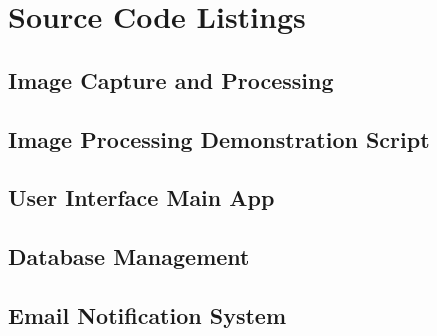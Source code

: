 \chapter{Source Code Listings} \label{appendix:b}

\section{Image Capture and Processing}




\section{Image Processing Demonstration Script}


\section{User Interface Main App}


\section{Database Management}


\section{Email Notification System}


